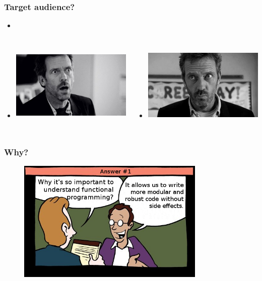 \documentclass[18pt, compress, aspectratio=169]{beamer}
\begin{document}
\begin{frame}[fragile]
    \frametitle{Target audience?}
    \begin{itemize}[leftmargin=*]
        \item <+->
    \end{itemize}

    \vspace{-40pt}

    \begin{columns}[T,onlytextwidth]
    \begin{itemize}[leftmargin=*]
        \item <+->\includegraphics[width=6cm,height=3.5cm]{house1.jpeg}
    \end{itemize}

    \vspace{20pt}

    \begin{itemize}[leftmargin=*]
        \item <+->\includegraphics[width=6cm,height=3.5cm]{house2.png}
    \end{itemize}
    \end{columns}
\end{frame}

\begin{frame}
    \frametitle{Why?}
    \vspace{-25pt}
    \begin{figure}
        \includegraphics[width=0.8\textwidth,center]{first_option.png}
    \end{figure}
\end{frame}
\end{document}
